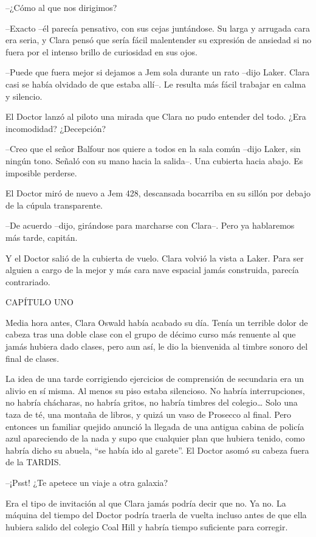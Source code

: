 {--¿Cómo al que nos dirigimos?}

{--Exacto --él parecía pensativo, con sus cejas juntándose. Su larga y
 arrugada cara era seria, y Clara pensó que sería fácil malentender su
 expresión de ansiedad si no fuera por el intenso brillo de curiosidad en
sus ojos.}

{--Puede que fuera mejor si dejamos a Jem sola durante un rato --dijo
 Laker. Clara casi se había olvidado de que estaba allí--. Le resulta más
fácil trabajar en calma y silencio.}

{El Doctor lanzó al piloto una mirada que Clara no pudo entender del
todo. ¿Era incomodidad? ¿Decepción?}

{--Creo que el señor Balfour nos quiere a todos en la sala común --dijo
 Laker, sin ningún tono. Señaló con su mano hacia la salida--. Una
cubierta hacia abajo. Es imposible perderse.}

{El Doctor miró de nuevo a Jem 428, descansada bocarriba en su sillón por
debajo de la cúpula transparente.}

{--De acuerdo --dijo, girándose para marcharse con Clara--. Pero ya
hablaremos más tarde, capitán.}

{Y el Doctor salió de la cubierta de vuelo. Clara volvió la vista a
 Laker. Para ser alguien a cargo de la mejor y más cara nave espacial
jamás construida, parecía contrariado.}

{CAPÍTULO UNO}

{Media hora antes, Clara Oswald había acabado su día. Tenía un terrible
 dolor de cabeza tras una doble clase con el grupo de décimo curso más
 renuente al que jamás hubiera dado clases, pero aun así, le dio la
bienvenida al timbre sonoro del final de clases.}

{La idea de una tarde corrigiendo ejercicios de comprensión de secundaria
 era un alivio en sí misma. Al menos su piso estaba silencioso. No habría
 interrupciones, no habría chácharas, no habría gritos, no habría timbres
 del colegio\ldots{} Solo una taza de té, una montaña de libros, y quizá
 un vaso de Prosecco al final. Pero entonces un familiar quejido anunció
 la llegada de una antigua cabina de policía azul apareciendo de la nada
 y supo que cualquier plan que hubiera tenido, como habría dicho su
 abuela, ``se había ido al garete''. El Doctor asomó su cabeza fuera de
la TARDIS.}

{--¡Psst! ¿Te apetece un viaje a otra galaxia?}

{Era el tipo de invitación al que Clara jamás podría decir que no. Ya no.
 La máquina del tiempo del Doctor podría traerla de vuelta incluso antes
 de que ella hubiera salido del colegio Coal Hill y habría tiempo
suficiente para corregir.}

